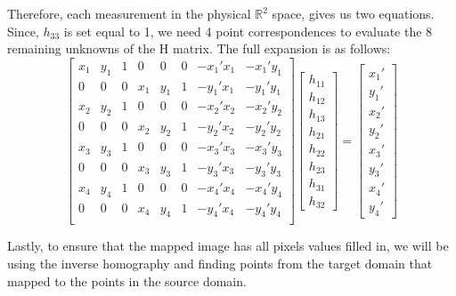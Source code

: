 \documentclass{article}
\begin{document}
Therefore, each measurement in the physical $\mathbb{R}^2$ space, gives us two equations. Since, $h_33$ is set equal to 1, we need 4 point correspondences to evaluate the 8 remaining unknowns of the H matrix. The full expansion is as follows:
\[\begin{bmatrix}
    x_1 & y_1 & 1 & 0 & 0 & 0 & -x_1'x_1 & -x_1'y_1 \\
    0 & 0 & 0 & x_1 & y_1 & 1 & -y_1'x_1 & -y_1'y_1 \\
    x_2 & y_2 & 1 & 0 & 0 & 0 & -x_2'x_2 & -x_2'y_2 \\
    0 & 0 & 0 & x_2 & y_2 & 1 & -y_2'x_2 & -y_2'y_2 \\
    x_3 & y_3 & 1 & 0 & 0 & 0 & -x_3'x_3 & -x_3'y_3 \\
    0 & 0 & 0 & x_3 & y_3 & 1 & -y_3'x_3 & -y_3'y_3 \\
    x_4 & y_4 & 1 & 0 & 0 & 0 & -x_4'x_4 & -x_4'y_4 \\
    0 & 0 & 0 & x_4 & y_4 & 1 & -y_4'x_4 & -y_4'y_4 \\
\end{bmatrix} \begin{bmatrix}
    h_{11} \\ h_{12} \\ h_{13} \\ h_{21} \\ h_{22} \\ h_{23} \\ h_{31} \\ h_{32}
\end{bmatrix} = \begin{bmatrix}
    x_1' \\ y_1' \\ x_2' \\ y_2' \\ x_3' \\ y_3' \\ x_4' \\ y_4'
\end{bmatrix}\]

Lastly, to ensure that the mapped image has all pixels values filled in, we will be using the inverse homography and finding points from the target domain that mapped to the points in the source domain.
\end{document}
